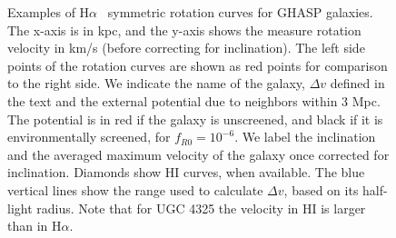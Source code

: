 \documentclass{emulateapj}
\newcommand{\ha}{H$\alpha$}
\begin{document}
\begin{figure}
\caption{Examples of \ha~ symmetric rotation curves for GHASP galaxies.  The x-axis  is in kpc, and the y-axis shows the measure rotation velocity in km/s (before 
correcting for inclination). The
left side points of the rotation curves are shown as red points for comparison 
to the right side. We indicate the
name of the galaxy,  $\Delta v$ defined in the text and the external 
potential due to neighbors within 3 Mpc. 
The potential is  
in red if the galaxy is unscreened, 
and black if it is environmentally screened, for $f_{R0}=10^{-6}$. 
We label the inclination and the averaged maximum velocity of the galaxy
once corrected for inclination.
Diamonds show HI curves, when available. The blue vertical lines show the range 
used to calculate $\Delta v$, based on its half-light radius. Note that for UGC 4325
the velocity in HI is larger than in \ha{}.  
\label{fig:GHASPsym}}
\end{figure}
\end{document}
